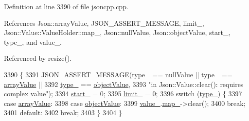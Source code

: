 Definition at line 3390 of file jsoncpp.\+cpp.



References Json\+::array\+Value, J\+S\+O\+N\+\_\+\+A\+S\+S\+E\+R\+T\+\_\+\+M\+E\+S\+S\+A\+GE, limit\+\_\+, Json\+::\+Value\+::\+Value\+Holder\+::map\+\_\+, Json\+::null\+Value, Json\+::object\+Value, start\+\_\+, type\+\_\+, and value\+\_\+.



Referenced by resize().


\begin{DoxyCode}
3390                   \{
3391   \hyperlink{json_8h_ad7facdeeca0f495765e3b204c265eadb}{JSON\_ASSERT\_MESSAGE}(\hyperlink{class_json_1_1_value_abd222c2536dc88bf330dedcd076d2356}{type\_} == \hyperlink{namespace_json_a7d654b75c16a57007925868e38212b4ea7d9899633b4409bd3fc107e6737f8391}{nullValue} || 
      \hyperlink{class_json_1_1_value_abd222c2536dc88bf330dedcd076d2356}{type\_} == \hyperlink{namespace_json_a7d654b75c16a57007925868e38212b4eadc8f264f36b55b063c78126b335415f4}{arrayValue} ||
3392                           \hyperlink{class_json_1_1_value_abd222c2536dc88bf330dedcd076d2356}{type\_} == \hyperlink{namespace_json_a7d654b75c16a57007925868e38212b4eae8386dcfc36d1ae897745f7b4f77a1f6}{objectValue},
3393                       \textcolor{stringliteral}{"in Json::Value::clear(): requires complex value"});
3394   \hyperlink{class_json_1_1_value_a1c3aeb0fa8fefe93776cb347c76a25a8}{start\_} = 0;
3395   \hyperlink{class_json_1_1_value_afe377e25f6d3b5b8ea7221c84f29412a}{limit\_} = 0;
3396   \textcolor{keywordflow}{switch} (\hyperlink{class_json_1_1_value_abd222c2536dc88bf330dedcd076d2356}{type\_}) \{
3397   \textcolor{keywordflow}{case} \hyperlink{namespace_json_a7d654b75c16a57007925868e38212b4eadc8f264f36b55b063c78126b335415f4}{arrayValue}:
3398   \textcolor{keywordflow}{case} \hyperlink{namespace_json_a7d654b75c16a57007925868e38212b4eae8386dcfc36d1ae897745f7b4f77a1f6}{objectValue}:
3399     \hyperlink{class_json_1_1_value_aef578244546212705b9f81eb84d7e151}{value\_}.\hyperlink{union_json_1_1_value_1_1_value_holder_a1e7a5b86d4f52234f55c847ad1ce389a}{map\_}->clear();
3400     \textcolor{keywordflow}{break};
3401   \textcolor{keywordflow}{default}:
3402     \textcolor{keywordflow}{break};
3403   \}
3404 \}
\end{DoxyCode}
\mbox{\label{class_json_1_1_value_aefa4464ca1bb0bcc9a87b38ed62ca2e0}} 
